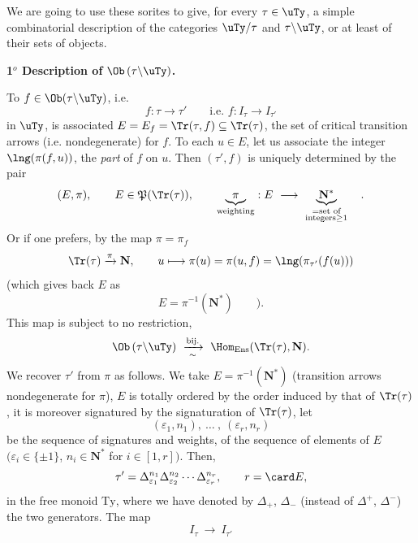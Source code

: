 We are going to use these sorites to give, for every $\tau \in \uTy$, a simple combinatorial description of the categories $\uTy/\tau$ and $\tau\backslash\uTy$, or at least of their sets of objects.

\textbf{1$^o$ Description of} $\Ob\,(\tau\backslash\uTy)$\textbf{.}

To $f \in \Ob(\tau\backslash\uTy)$, i.e.
\[
f : \tau \longrightarrow \tau' \qquad \text{i.e. } f : I_\tau \longrightarrow I_{\tau'}
\]
in $\uTy$, is associated $E = E_f = \Tr(\tau, f) \subseteq \Tr(\tau)$, the set of critical transition arrows (i.e. nondegenerate) for $f$. To each $u \in E$, let us associate the integer $\lng(\pi(f, u))$,
the \textit{part} of $f$ on $u$. Then $(\tau', f)$ is uniquely determined by the pair
\[
(E, \pi), \qquad E \in \mathfrak{P}(\Tr(\tau)), \qquad \underbrace{\pi}_{\text{weighting}} : E \ \longrightarrow\ \underbrace{\mathbf{N}^*}_{\substack{= \text{set of} \\ \text{integers} \geq 1}} \quad .
\]
Or if one prefers, by the map $\pi = \pi_f$
\[
\Tr(\tau) \xrightarrow{\pi} \mathbf{N}, \qquad u \longmapsto \pi(u) = \pi(u, f) = \lng(\pi_{\tau'}(f(u)))
\]
(which gives back $E$ as
\[
E = \pi^{-1}(\mathbf{N}^*) \qquad ).
\]
This map is subject to no restriction,
\[
\Ob\,(\tau\backslash\uTy) \ \xrightarrow[\sim]{\text{bij.}}\ \Hom_{\mathrm{Ens}}(\Tr(\tau), \mathbf{N}).
\]
We recover $\tau'$ from $\pi$ as follows. We take $E = \pi^{-1}(\mathbf{N}^*)$ (transition arrows nondegenerate for $\pi$), $E$ is totally ordered by the order induced by that of $\Tr(\tau)$, it is moreover signatured by the signaturation of $\Tr(\tau)$, let
\[
(\varepsilon_1, n_1),\ \dots\ ,\ (\varepsilon_r, n_r)
\]
be the sequence of signatures and weights, of the sequence of elements of $E$ $(\varepsilon_i \in \{\pm 1\}$, $n_i \in \mathbf{N}^*$ for $i \in [1, r])$. Then,
\[
\tau' = \Delta_{\varepsilon_1}^{n_1} \Delta_{\varepsilon_2}^{n_2} \cdots \Delta_{\varepsilon_r}^{n_r}, \qquad r = \card E,
\]
in the free monoid $\mathrm{Ty}$, where we have denoted by $\Delta_+$, $\Delta_-$ (instead of $\Delta^+$, $\Delta^-$) the two generators. The map
\[
I_\tau \ \longrightarrow\ I_{\tau'}
\]
